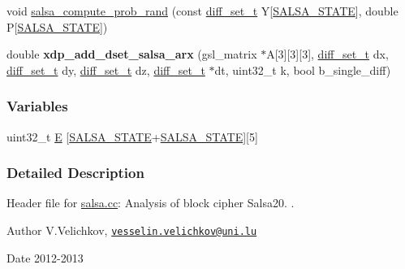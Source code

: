 \begin{DoxyCompactItemize}
\item 
void \hyperlink{salsa_8hh_a0497e7b685ebd10996738b4fd2326d74}{salsa\-\_\-compute\-\_\-prob\-\_\-rand} (const \hyperlink{structdiff__set__t}{diff\-\_\-set\-\_\-t} \-Y\mbox{[}\hyperlink{salsa_8hh_a642186115ff24eb2f42febb3ccaa093f}{\-S\-A\-L\-S\-A\-\_\-\-S\-T\-A\-T\-E}\mbox{]}, double \-P\mbox{[}\hyperlink{salsa_8hh_a642186115ff24eb2f42febb3ccaa093f}{\-S\-A\-L\-S\-A\-\_\-\-S\-T\-A\-T\-E}\mbox{]})
\item 
\hypertarget{salsa_8hh_a287bafe63e9e494be9e4691f3e62166a}{double {\bfseries xdp\-\_\-add\-\_\-dset\-\_\-salsa\-\_\-arx} (gsl\-\_\-matrix $\ast$\-A\mbox{[}3\mbox{]}\mbox{[}3\mbox{]}\mbox{[}3\mbox{]}, \hyperlink{structdiff__set__t}{diff\-\_\-set\-\_\-t} dx, \hyperlink{structdiff__set__t}{diff\-\_\-set\-\_\-t} dy, \hyperlink{structdiff__set__t}{diff\-\_\-set\-\_\-t} dz, \hyperlink{structdiff__set__t}{diff\-\_\-set\-\_\-t} $\ast$dt, uint32\-\_\-t k, bool b\-\_\-single\-\_\-diff)}\label{salsa_8hh_a287bafe63e9e494be9e4691f3e62166a}

\end{DoxyCompactItemize}
\subsubsection*{\-Variables}
\begin{DoxyCompactItemize}
\item 
uint32\-\_\-t \hyperlink{salsa_8hh_ab44999d45b6e0fee6f910387230b783a}{\-E} \mbox{[}\hyperlink{salsa_8hh_a642186115ff24eb2f42febb3ccaa093f}{\-S\-A\-L\-S\-A\-\_\-\-S\-T\-A\-T\-E}+\hyperlink{salsa_8hh_a642186115ff24eb2f42febb3ccaa093f}{\-S\-A\-L\-S\-A\-\_\-\-S\-T\-A\-T\-E}\mbox{]}\mbox{[}5\mbox{]}
\end{DoxyCompactItemize}


\subsubsection{\-Detailed \-Description}
\-Header file for \hyperlink{salsa_8cc}{salsa.\-cc}\-: \-Analysis of block cipher \-Salsa20.  . \begin{DoxyAuthor}{\-Author}
\-V.\-Velichkov, \href{mailto:vesselin.velichkov@uni.lu}{\tt vesselin.\-velichkov@uni.\-lu} 
\end{DoxyAuthor}
\begin{DoxyDate}{\-Date}
2012-\/2013 
\end{DoxyDate}


